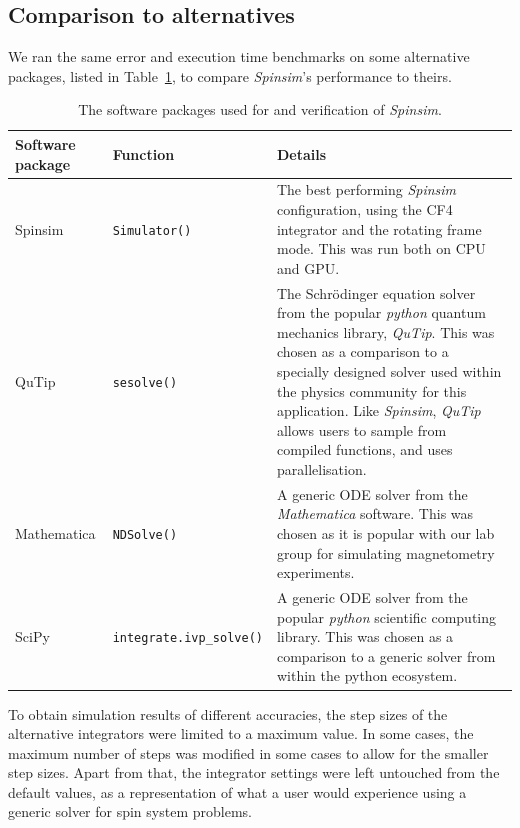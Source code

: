 \documentclass{jors}
\begin{document}
	\subsection{Comparison to alternatives}
		We ran the same error and execution time benchmarks on some alternative packages, listed in Table~\ref{tab:external}, to compare \emph{Spinsim}'s performance to theirs.
		\begin{table}[h!]
			\caption{The software packages used for and verification of \emph{Spinsim}.}
			\label{tab:external}
			\begin{tabular}{l|l|p{6.5cm}}
				\textbf{Software package}								&\textbf{Function}					&\textbf{Details}\\
				\hline
				Spinsim													&\texttt{Simulator()}				&The best performing \emph{Spinsim} configuration, using the CF4 integrator and the rotating frame mode. This was run both on CPU and GPU.
				\\
				\hline
				QuTip\cite{johansson_qutip_2013}						&\texttt{sesolve()}					&The Schr\"odinger equation solver from the popular \emph{python} quantum mechanics library, \emph{QuTip}.
				This was chosen as a comparison to a specially designed solver used within the physics community for this application.
				Like \emph{Spinsim}, \emph{QuTip} allows users to sample from compiled functions, and uses parallelisation.\\
				\hline
				Mathematica\cite{wolfram_research_inc_mathematica_2020}	&\texttt{NDSolve()}					&A generic ODE solver from the \emph{Mathematica} software.
				This was chosen as it is popular with our lab group for simulating magnetometry experiments.\\
				\hline
				SciPy\cite{virtanen_scipy_2020}							&\texttt{integrate.ivp\_solve()}	&A generic ODE solver from the popular \emph{python} scientific computing library.
				This was chosen as a comparison to a generic solver from within the python ecosystem.
			\end{tabular}
		\end{table}
		To obtain simulation results of different accuracies, the step sizes of the alternative integrators were limited to a maximum value.
		In some cases, the maximum number of steps was modified in some cases to allow for the smaller step sizes.
		Apart from that, the integrator settings were left untouched from the default values, as a representation of what a user would experience using a generic solver for spin system problems.
\end{document}
